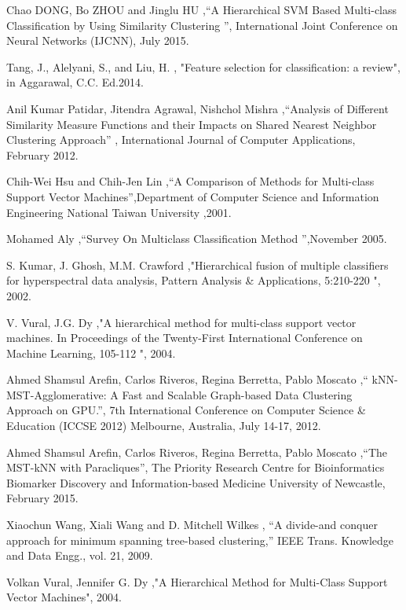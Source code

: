 \documentclass[a4paper, 10pt, conference]{ieeeconf}      %
\begin{document}
\begin{thebibliography}{99}

\bibitem{} Chao DONG, Bo ZHOU and Jinglu HU { ,“A Hierarchical SVM Based Multi-class Classification by Using Similarity Clustering ”}, International Joint Conference on Neural Networks (IJCNN), July 2015. 

\bibitem{} Tang, J., Alelyani, S., and Liu, H. { , "Feature selection for classification: a review"}, in Aggarawal, C.C. Ed.2014.

\bibitem{}  Anil Kumar Patidar, Jitendra Agrawal, Nishchol Mishra { ,“Analysis of Different Similarity Measure Functions and their Impacts on Shared Nearest Neighbor Clustering Approach” }, International Journal of Computer Applications, February 2012.

\bibitem{} Chih-Wei Hsu and Chih-Jen Lin { ,“A Comparison of Methods for Multi-class Support Vector Machines”},Department of Computer Science and Information Engineering National Taiwan University ,2001.

\bibitem{} Mohamed Aly  { ,“Survey On Multiclass Classification Method ”},November 2005.

\bibitem{} S. Kumar, J. Ghosh, M.M. Crawford { ,"Hierarchical fusion of multiple classifiers for hyperspectral data analysis, Pattern Analysis \& Applications, 5:210-220 "}, 2002.

\bibitem{} V. Vural, J.G. Dy { ,"A hierarchical method for multi-class support vector machines. In Proceedings of the Twenty-First International Conference on Machine Learning, 105-112 "}, 2004.

\bibitem{} Ahmed Shamsul Arefin, Carlos Riveros, Regina Berretta, Pablo Moscato { ,“ kNN-MST-Agglomerative: A Fast and Scalable Graph-based Data Clustering Approach on GPU.”}, 7th International Conference on Computer Science \& Education (ICCSE 2012) Melbourne, Australia, July 14-17, 2012.

\bibitem{} Ahmed Shamsul Arefin, Carlos Riveros, Regina Berretta, Pablo Moscato { ,“The MST-kNN with Paracliques”}, The Priority Research Centre for Bioinformatics Biomarker Discovery and Information-based Medicine University of Newcastle, February 2015.

\bibitem{} Xiaochun Wang, Xiali Wang and D. Mitchell Wilkes {, “A divide-and conquer
approach for minimum spanning tree-based clustering,”} IEEE  Trans. Knowledge and Data Engg., vol. 21, 2009.

\bibitem{} Volkan Vural, Jennifer G. Dy {,"A Hierarchical Method for Multi-Class Support Vector Machines"}, 2004.


\end{thebibliography}
\end{document}

